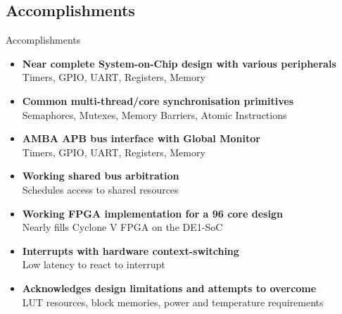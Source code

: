 \documentclass[aspectratio=169]{beamer}
\begin{document}
\subsection{Accomplishments}
\begin{frame}{Accomplishments}
\begin{itemize}
    \item \textbf{Near complete System-on-Chip design with various peripherals}\\
    Timers, GPIO, UART, Registers, Memory
    
    \item \textbf{Common multi-thread/core synchronisation primitives}\\
    Semaphores, Mutexes, Memory Barriers, Atomic Instructions
    
    \item \textbf{AMBA APB bus interface with Global Monitor}\\
    Timers, GPIO, UART, Registers, Memory
    
    \item \textbf{Working shared bus arbitration}\\
    Schedules access to shared resources
    
    \item \textbf{Working FPGA implementation for a 96 core design}\\
    Nearly fills Cyclone V FPGA on the DE1-SoC
    
    \item \textbf{Interrupts with hardware context-switching}\\
    Low latency to react to interrupt
    
    \item \textbf{Acknowledges design limitations and attempts to overcome}\\
    LUT resources, block memories, power and temperature requirements
\end{itemize}
\end{frame}
\end{document}
